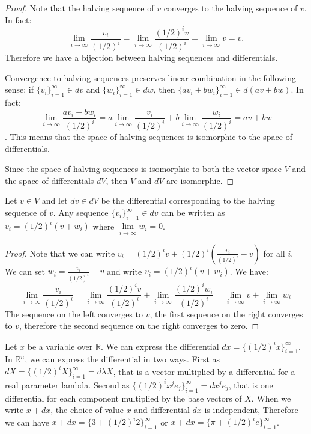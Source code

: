 \begin{proof}
	Note that the halving sequence of $v$ converges to the halving sequence of $v$. In fact:
	$$ \lim\limits_{i \to \infty} \frac{v_i}{(1/2)^i} = \lim\limits_{i \to \infty} \frac{(1/2)^i v}{(1/2)^i} = \lim\limits_{i \to \infty} v = v.$$ Therefore we have a bijection between halving sequences and differentials.
	
	Convergence to halving sequences preserves linear combination in the following sense: if $\{v_i\}_{i=1}^{\infty} \in dv$ and $\{w_i\}_{i=1}^{\infty} \in dw$, then $\{a v_i + b w_i\}_{i=1}^{\infty} \in d(av+bw)$. In fact:
	$$\lim\limits_{i \to \infty} \frac{a v_i + b w_i}{(1/2)^i} = a\lim\limits_{i \to \infty} \frac{v_i}{(1/2)^i} + b\lim\limits_{i \to \infty} \frac{w_i}{(1/2)^i} = a v + b w$$. This means that the space of halving sequences is isomorphic to the space of differentials.
	
	Since the space of halving sequences is isomorphic to both the vector space $V$ and the space of differentials $dV$, then $V$ and $dV$ are isomorphic.
\end{proof}

\begin{prop}
	Let $v \in V$ and let $dv \in dV$ be the differential corresponding to the halving sequence of $v$. Any sequence $\{v_i\}_{i=1}^{\infty} \in dv$ can be written as $v_i = (1/2)^i(v + w_i)$ where $\lim\limits_{i \to \infty} w_i = 0$.
\end{prop}

\begin{proof}
	Note that we can write $v_i = (1/2)^i v + (1/2)^i \left( \frac{v_i}{(1/2)^i} - v\right)$ for all $i$. We can set $w_i = \frac{v_i}{(1/2)^i} - v$ and write $v_i = (1/2)^i(v + w_i)$. We have:
	$$\lim\limits_{i \to \infty} \frac{v_i}{(1/2)^i} = \lim\limits_{i \to \infty} \frac{(1/2)^i v}{(1/2)^i} + \lim\limits_{i \to \infty} \frac{(1/2)^i w_i}{(1/2)^i} = \lim\limits_{i \to \infty} v + \lim\limits_{i \to \infty} w_i$$
	The sequence on the left converges to $v$, the first sequence on the right converges to $v$, therefore the second sequence on the right converges to zero.
\end{proof}

\begin{remark}
	Let $x$ be a variable over $\mathbb{R}$. We can express the differential $dx=\{(1/2)^i x\}_{i=1}^{\infty}$. In $\mathbb{R}^n$, we can express the differential in two ways. First as $dX = \{(1/2)^i X\}_{i=1}^{\infty} = d\lambda X$, that is a vector multiplied by a differential for a real parameter lambda. Second as $\{(1/2)^i x^j e_j\}_{i=1}^{\infty} = dx^j e_j$, that is one differential for each component multiplied by the base vectors of $X$. When we write $x+dx$, the choice of value $x$ and differential $dx$ is independent, Therefore we can have $x+dx=\{3 + (1/2)^i 2\}_{i=1}^{\infty}$ or $x+dx=\{\pi + (1/2)^i e\}_{i=1}^{\infty}$.
\end{remark}


